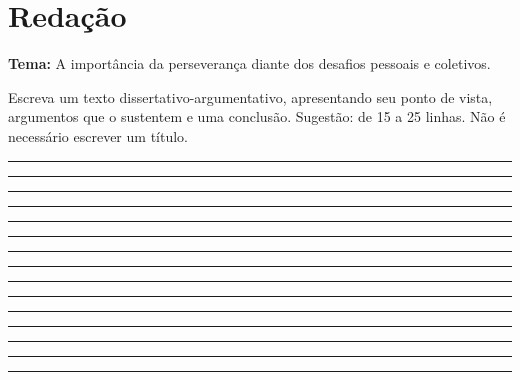 \documentclass[12pt,a4paper]{article}
\begin{document}
\newpage
\section*{Redação}
\noindent\textbf{Tema:} A importância da perseverança diante dos desafios pessoais e coletivos.

\medskip
\noindent Escreva um texto dissertativo-argumentativo, apresentando seu ponto de vista, argumentos que o sustentem e uma conclusão. Sugestão: de 15 a 25 linhas. Não é necessário escrever um título.

\vspace{0.4cm}
\noindent\rule{\textwidth}{0.3pt}\par\vspace{0.45cm}
\noindent\rule{\textwidth}{0.3pt}\par\vspace{0.5cm}
\noindent\rule{\textwidth}{0.3pt}\par\vspace{0.5cm}
\noindent\rule{\textwidth}{0.3pt}\par\vspace{0.5cm}
\noindent\rule{\textwidth}{0.3pt}\par\vspace{0.5cm}
\noindent\rule{\textwidth}{0.3pt}\par\vspace{0.5cm}
\noindent\rule{\textwidth}{0.3pt}\par\vspace{0.5cm}
\noindent\rule{\textwidth}{0.3pt}\par\vspace{0.5cm}
\noindent\rule{\textwidth}{0.3pt}\par\vspace{0.5cm}
\noindent\rule{\textwidth}{0.3pt}\par\vspace{0.5cm}
\noindent\rule{\textwidth}{0.3pt}\par\vspace{0.5cm}
\noindent\rule{\textwidth}{0.3pt}\par\vspace{0.5cm}
\noindent\rule{\textwidth}{0.3pt}\par\vspace{0.5cm}
\noindent\rule{\textwidth}{0.3pt}\par\vspace{0.5cm}
\noindent\rule{\textwidth}{0.3pt}\par\vspace{0.5cm}
\end{document}
